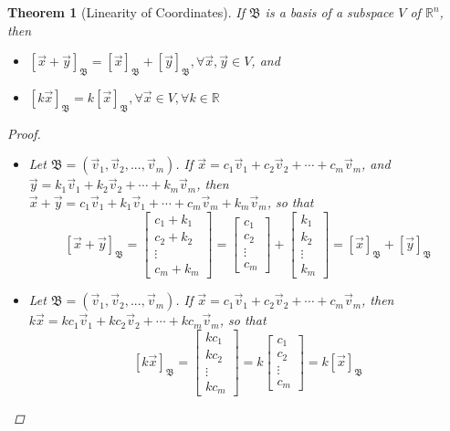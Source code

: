 \documentclass[10pt]{report}
\newtheorem{thm2}{Theorem}[section]
\begin{document}
\begin{thm2}[Linearity of Coordinates]
If $\mathfrak{B}$ is a basis of a subspace $V$ of $\mathbb{R}^n$, then
\begin{itemize}
\item[a.] $[\vec{x}+\vec{y}]_\mathfrak{B} = [\vec{x}]_\mathfrak{B} + [\vec{y}]_\mathfrak{B}, \forall \vec{x}, \vec{y}\in V$, and
\item[b.] $[k\vec{x}]_\mathfrak{B} = k[\vec{x}]_\mathfrak{B}, \forall \vec{x}\in V, \forall k\in\mathbb{R}$
\end{itemize}
\begin{proof}
\begin{itemize}
\item[a.] Let $\mathfrak{B}=(\vec{v}_1, \vec{v}_2, ..., \vec{v}_m)$. If $\vec{x}=c_1\vec{v}_1 + c_2\vec{v}_2 + \cdots + c_m\vec{v}_m$, and $\vec{y}=k_1\vec{v}_1 + k_2\vec{v}_2 + \cdots + k_m\vec{v}_m$, then $\vec{x}+\vec{y}=c_1\vec{v}_1 + k_1\vec{v}_1 + \cdots + c_m\vec{v}_m + k_m\vec{v}_m$, so that
$$[\vec{x}+\vec{y}]_\mathfrak{B} = \left[\begin{array}{c}
c_1+k_1\\
c_2+k_2\\
\vdots\\
c_m+k_m
\end{array}\right] = \left[\begin{array}{c}
c_1\\
c_2\\
\vdots\\
c_m
\end{array}\right] + 
\left[\begin{array}{c}
k_1\\
k_2\\
\vdots\\
k_m
\end{array}\right]
=[\vec{x}]_\mathfrak{B} + [\vec{y}]_\mathfrak{B}$$
\item[b.] Let $\mathfrak{B}=(\vec{v}_1, \vec{v}_2, ..., \vec{v}_m)$. If $\vec{x}=c_1\vec{v}_1 + c_2\vec{v}_2 + \cdots + c_m\vec{v}_m$, then $k\vec{x}=kc_1\vec{v}_1+kc_2\vec{v}_2 + \cdots + kc_m\vec{v}_m$, so that
$$[k\vec{x}]_\mathfrak{B} = \left[\begin{array}{c}
kc_1\\
kc_2\\
\vdots\\
kc_m
\end{array}\right] = k\left[\begin{array}{c}
c_1\\
c_2\\
\vdots\\
c_m
\end{array}\right]=k[\vec{x}]_\mathfrak{B}$$
\end{itemize}
\end{proof}
\end{thm2}
\end{document}
